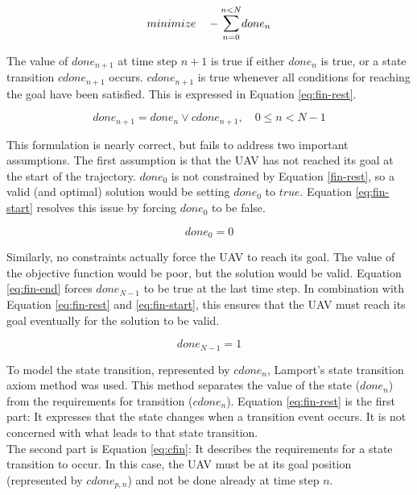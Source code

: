 \begin{equation}
\label{eq:goal-fun}
minimize \quad - \mathlarger{\sum}_{n=0}^{n < N} done_n
\end{equation}

The value of $done_{n+1}$ at time step $n + 1$ is true if either $done_n$ is true, or a state transition $cdone_{n+1}$ occurs. $cdone_{n+1}$ is true whenever all conditions for reaching the goal have been satisfied. This is expressed in Equation \ref{eq:fin-rest}.

\begin{equation}
\label{eq:fin-rest}
done_{n+1} = done_n \vee cdone_{n+1},  \quad 0 \leq n < N  - 1
\end{equation}

This formulation is nearly correct, but fails to address two important assumptions. The first assumption is that the UAV has not reached its goal at the start of the trajectory. $done_0$ is not constrained by Equation \ref{fin-rest}, so a valid (and optimal) solution would be setting $done_0$ to $true$. Equation \ref{eq:fin-start} resolves this issue by forcing $done_0$ to be false.

\begin{equation}
\label{eq:fin-start}
done_0 = 0
\end{equation}

Similarly, no constraints actually force the UAV to reach its goal. The value of the objective function would be poor, but the solution would be valid. Equation \ref{eq:fin-end} forces $done_{N-1}$ to be true at the last time step. In combination with Equation \ref{eq:fin-rest} and \ref{eq:fin-start}, this ensures that the UAV must reach its goal eventually for the solution to be valid.

\begin{equation}
\label{eq:fin-end}
done_{N - 1} = 1
\end{equation}

To model the state transition, represented by $cdone_{n}$, Lamport's \cite{Lamport1989} state transition axiom method was used. This method separates the value of the state ($done_{n}$) from the requirements for transition ($cdone_{n}$). Equation \ref{eq:fin-rest} is the first part: It expresses that the state changes when a transition event occurs. It is not concerned with what leads to that state transition. \\
The second part is Equation \ref{eq:cfin}: It describes the requirements for a state transition to occur. In this case, the UAV must be at its goal position (represented by $cdone_{p,n}$) and not be done already at time step $n$.

